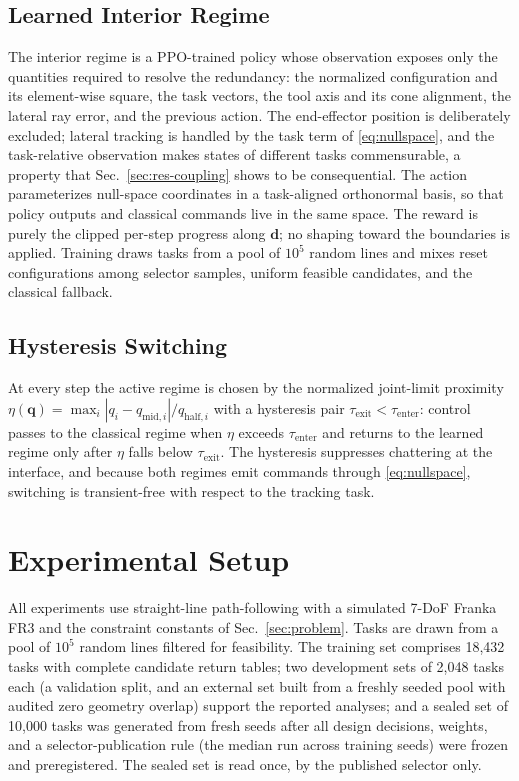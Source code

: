 \documentclass[journal]{IEEEtran}
\newcommand{\nTrain}{18{,}432}
\newcommand{\nDev}{2{,}048}
\newcommand{\nSealed}{10{,}000}
\begin{document}
\subsection{Learned Interior Regime}
The interior regime is a PPO-trained policy whose observation exposes
only the quantities required to resolve the redundancy: the normalized
configuration and its element-wise square, the task vectors, the tool
axis and its cone alignment, the lateral ray error, and the previous
action. The end-effector position is deliberately excluded; lateral
tracking is handled by the task term of \eqref{eq:nullspace}, and the
task-relative observation makes states of different tasks commensurable,
a property that Sec.~\ref{sec:res-coupling} shows to be consequential.
The action parameterizes null-space coordinates in a task-aligned
orthonormal basis, so that policy outputs and classical commands live in
the same space. The reward is purely the clipped per-step progress along
$\mathbf{d}$; no shaping toward the boundaries is applied. Training
draws tasks from a pool of $10^{5}$ random lines and mixes reset
configurations among selector samples, uniform feasible candidates, and
the classical fallback.

\subsection{Hysteresis Switching}
At every step the active regime is chosen by the normalized joint-limit
proximity $\eta(\mathbf{q})=\max_{i}
|q_{i}-q_{\mathrm{mid},i}|/q_{\mathrm{half},i}$ with a hysteresis pair
$\tau_{\mathrm{exit}}<\tau_{\mathrm{enter}}$: control passes to the
classical regime when $\eta$ exceeds $\tau_{\mathrm{enter}}$ and returns
to the learned regime only after $\eta$ falls below
$\tau_{\mathrm{exit}}$. The hysteresis suppresses chattering at the
interface, and because both regimes emit commands through
\eqref{eq:nullspace}, switching is transient-free with respect to the
tracking task.

\section{Experimental Setup}
\label{sec:setup}
All experiments use straight-line path-following with a simulated 7-DoF
Franka FR3 and the constraint constants of
Sec.~\ref{sec:problem}. Tasks are drawn from a pool of $10^{5}$ random
lines filtered for feasibility. The training set comprises \nTrain{}
tasks with complete candidate return tables; two development sets of
\nDev{} tasks each (a validation split, and an external set built from a
freshly seeded pool with audited zero geometry overlap) support the
reported analyses; and a sealed set of \nSealed{} tasks was generated
from fresh seeds after all design decisions, weights, and a
selector-publication rule (the median run across training seeds) were
frozen and preregistered. The sealed set is read once, by the published
selector only.
\end{document}
